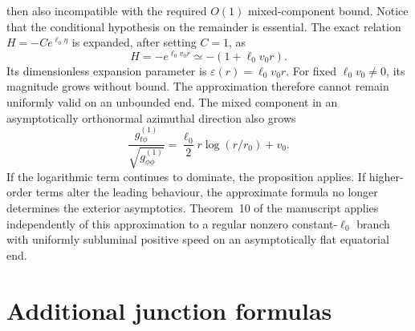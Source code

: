 \documentclass[11pt,a4paper]{article}
\numberwithin{equation}{section}
\theoremstyle{plain}
\theoremstyle{definition}
\theoremstyle{remark}
\newcommand{\ellzero}{\ell_0}
\begin{document}
then also incompatible with the required $O(1)$ mixed-component bound. Notice that the conditional hypothesis on the remainder is essential. The exact
relation $H=-Ce^{\ellzero\eta}$ is expanded, after setting $C=1$, as
\begin{equation}\label{eq:H-linearization-asymptotic-section}
H=-e^{\ellzero v_0r}\simeq-(1+\ellzero v_0r).
\end{equation}
Its dimensionless expansion parameter is $\varepsilon(r)=\ellzero v_0r$. For fixed $\ellzero v_0\neq 0$, its magnitude grows without bound. The approximation therefore cannot remain uniformly valid on an unbounded end. The mixed component in an asymptotically orthonormal
azimuthal direction also grows
\begin{equation}\label{eq:orthonormal-mixed-growth}
\frac{g_{t\phi}^{(1)}}{\sqrt{g_{\phi\phi}^{(1)}}}=\frac{\ellzero}{2}r\log(r/r_0)+v_0.
\end{equation}
If the logarithmic term continues to dominate, the proposition applies. If higher-order terms alter the leading behaviour, the approximate formula no longer determines the exterior asymptotics. Theorem~10 of the manuscript applies independently of this approximation to a regular nonzero constant-$\ellzero$ branch with uniformly subluminal positive speed on an asymptotically flat equatorial end.

\section{Additional junction formulas}\label{supp:additional-junction}
\end{document}
